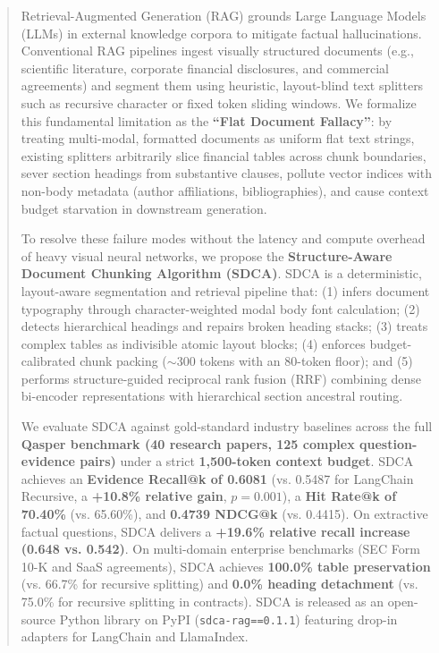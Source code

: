 \documentclass[conference]{IEEEtran}
\begin{document}
\begin{abstract}
Retrieval-Augmented Generation (RAG) grounds Large Language Models (LLMs) in external knowledge corpora to mitigate factual hallucinations. Conventional RAG pipelines ingest visually structured documents (e.g., scientific literature, corporate financial disclosures, and commercial agreements) and segment them using heuristic, layout-blind text splitters such as recursive character or fixed token sliding windows. We formalize this fundamental limitation as the \textbf{``Flat Document Fallacy''}: by treating multi-modal, formatted documents as uniform flat text strings, existing splitters arbitrarily slice financial tables across chunk boundaries, sever section headings from substantive clauses, pollute vector indices with non-body metadata (author affiliations, bibliographies), and cause context budget starvation in downstream generation.

To resolve these failure modes without the latency and compute overhead of heavy visual neural networks, we propose the \textbf{Structure-Aware Document Chunking Algorithm (SDCA)}. SDCA is a deterministic, layout-aware segmentation and retrieval pipeline that: (1) infers document typography through character-weighted modal body font calculation; (2) detects hierarchical headings and repairs broken heading stacks; (3) treats complex tables as indivisible atomic layout blocks; (4) enforces budget-calibrated chunk packing ($\sim$300 tokens with an 80-token floor); and (5) performs structure-guided reciprocal rank fusion (RRF) combining dense bi-encoder representations with hierarchical section ancestral routing.

We evaluate SDCA against gold-standard industry baselines across the full \textbf{Qasper benchmark (40 research papers, 125 complex question-evidence pairs)} under a strict \textbf{1,500-token context budget}. SDCA achieves an \textbf{Evidence Recall@k of 0.6081} (vs. 0.5487 for LangChain Recursive, a \textbf{+10.8\% relative gain}, $p=0.001$), a \textbf{Hit Rate@k of 70.40\%} (vs. 65.60\%), and \textbf{0.4739 NDCG@k} (vs. 0.4415). On extractive factual questions, SDCA delivers a \textbf{+19.6\% relative recall increase (0.648 vs. 0.542)}. On multi-domain enterprise benchmarks (SEC Form 10-K and SaaS agreements), SDCA achieves \textbf{100.0\% table preservation} (vs. 66.7\% for recursive splitting) and \textbf{0.0\% heading detachment} (vs. 75.0\% for recursive splitting in contracts). SDCA is released as an open-source Python library on PyPI (\texttt{sdca-rag==0.1.1}) featuring drop-in adapters for LangChain and LlamaIndex.
\end{abstract}
\end{document}
